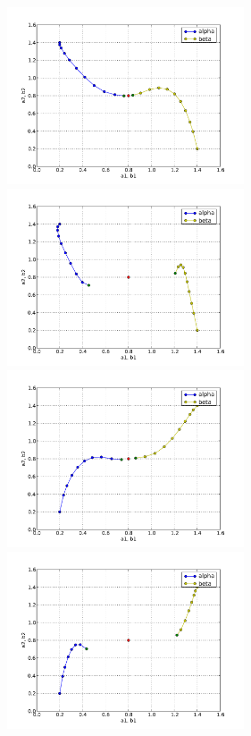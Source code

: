 \begin{figure}
  \begin{center}
    \includegraphics[width=7cm]{chapters/schroll/pdf/4Dscan1.pdf}
    \includegraphics[width=7cm]{chapters/schroll/pdf/4Dscan1-5.pdf}
    \includegraphics[width=7cm]{chapters/schroll/pdf/4Dscan2.pdf}
    \includegraphics[width=7cm]{chapters/schroll/pdf/4Dscan2-5.pdf}

\end{center}
\end{figure}
